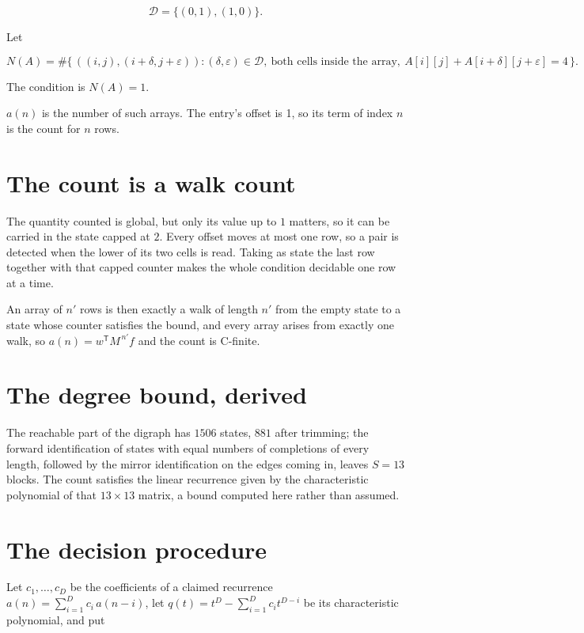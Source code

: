 \documentclass[11pt]{article}
\theoremstyle{definition}
\begin{document}
\[\mathcal{D} = \{(0,1), (1,0)\}.\]

Let

\[N(A) = \#\bigl\{\,((i,j),(i{+}\delta,j{+}\varepsilon)) : (\delta,\varepsilon) \in \mathcal{D},\ \text{both cells inside the array},\ A[i][j] + A[i{+}\delta][j{+}\varepsilon] = 4\,\bigr\}.\]

The condition is $N(A) = 1$.

$a(n)$ is the number of such arrays. The entry's offset is 1, so its term of index $n$ is the count for $n$ rows.

\section{The count is a walk count}

The quantity counted is global, but only its value up to $1$ matters, so it can be carried in the state capped at $2$. Every offset moves at most one row, so a pair is detected when the lower of its two cells is read. Taking as state the last row together with that capped counter makes the whole condition decidable one row at a time.

An array of $n'$ rows is then exactly a walk of length $n'$ from the empty state to a state whose counter satisfies the bound, and every array arises from exactly one walk, so $a(n) = w^{\mathsf T}M^{\,n'}f$ and the count is C-finite.

\section{The degree bound, derived}

The reachable part of the digraph has $1506$ states, $881$ after trimming; the forward identification of states with equal numbers of completions of every length, followed by the mirror identification on the edges coming in, leaves $S = 13$ blocks. The count satisfies the linear recurrence given by the characteristic polynomial of that $13\times13$ matrix, a bound computed here rather than assumed.

\section{The decision procedure}

Let $c_1,\dots,c_D$ be the coefficients of a claimed recurrence $a(n) = \sum_{i=1}^{D} c_i\,a(n-i)$, let $q(t) = t^{D} - \sum_{i=1}^{D} c_i t^{D-i}$ be its characteristic polynomial, and put
\end{document}
